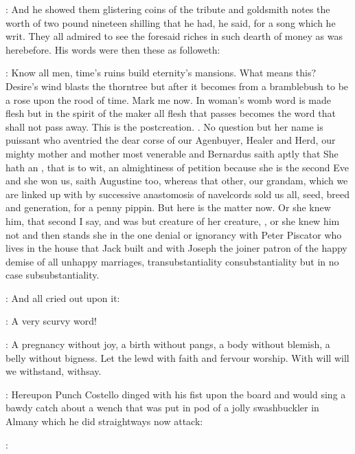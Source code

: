 :
And he showed them glistering coins of the tribute and goldsmith
notes the worth of two pound nineteen shilling that he had,
he said,
for a
song which he writ.
They all admired to see the foresaid riches in such
dearth of money as was herebefore.
His words were then these as followeth:

\stephen:
Know all men,
time's ruins build eternity's mansions.
What means this?
Desire's wind blasts the thorntree
but after it becomes from a bramblebush to be a
rose upon the rood of time.
Mark me now.
In woman's womb word is made
flesh but in the spirit of the maker all flesh that passes becomes the
word that shall not pass away.
This is the postcreation.
.
No question but her name is puissant who aventried the dear corse
of our Agenbuyer,
Healer and Herd,
our mighty mother and mother most
venerable and Bernardus saith aptly that She hath an ,
that is to wit,
an almightiness of petition because
she is the second Eve and she won us,
saith Augustine too,
whereas that
other,
our grandam,
which we are linked up with by successive anastomosis
of navelcords sold us all,
seed,
breed and generation,
for a penny
pippin.
But here is the matter now.
Or she knew him,
that second I say,
and was but creature of her creature,
,
or she knew him not and then stands she in the one denial or
ignorancy with Peter Piscator who lives in the house that Jack built and
with Joseph the joiner patron of the happy demise of all unhappy
marriages,
 transubstantiality  consubstantiality
but in no case subsubstantiality.

:
And all cried out upon it:

\All:
A very scurvy word!

\stephen:
A pregnancy without joy,
a birth without pangs,
a body without
blemish,
a belly without bigness.
Let the lewd with faith and fervour
worship.
With will will we withstand,
withsay.


:
Hereupon Punch Costello dinged with his fist upon the board and would
sing a bawdy catch  about a wench that was
put in pod of a jolly swashbuckler in Almany which he did straightways
now attack:

\punch:

